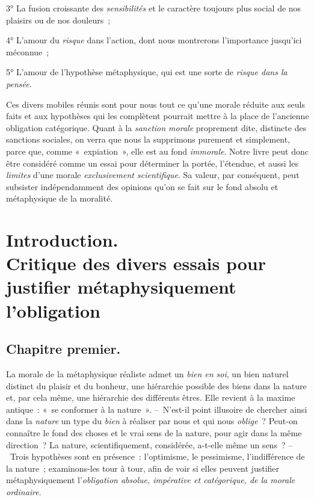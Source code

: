 \documentclass[french,twoside]{book} %
\begin{document}
3° La fusion croissante des \emph{sensibilités} et le caractère toujours plus social de nos plaisirs ou de nos douleurs ;\par
4° L’amour du \emph{risque} dans l’action, dont nous montrerons l’importance jusqu’ici méconnue ;\par
5° L’amour de l’hypothèse métaphysique, qui est une sorte de \emph{risque dans la pensée}.\par
Ces divers mobiles réunis sont pour nous tout ce qu’une morale réduite aux seuls faits et aux hypothèses qui les complètent pourrait mettre à la place de l’ancienne obligation catégorique. Quant à la \emph{sanction morale} proprement dite, distincte des sanctions sociales, on verra que nous la supprimons purement et simplement, parce que, comme « expiation », elle est au fond \emph{immorale}. Notre livre peut donc être considéré comme un essai pour déterminer la portée, l’étendue, et aussi les \emph{limites} d’une morale \emph{exclusivement scientifique}. Sa valeur, par conséquent, peut subsister indépendamment des opinions qu’on se fait sur le fond absolu et métaphysique de la moralité.
\section[{Introduction. Critique des divers essais pour justifier métaphysiquement l’obligation}]{Introduction. \\
Critique des divers essais pour justifier métaphysiquement l’obligation}\renewcommand{\leftmark}{Introduction. \\
Critique des divers essais pour justifier métaphysiquement l’obligation}

\subsection[{Chapitre premier.}]{Chapitre premier.}
\noindent La morale de la métaphysique réaliste admet un \emph{bien en soi}, un bien naturel distinct du plaisir et du bonheur, une hiérarchie possible des biens dans la nature et, par cela même, une hiérarchie des différents êtres. Elle revient à la maxime antique : « se conformer à la nature ». – N’est-il point illusoire de chercher ainsi dans la \emph{nature} un type du \emph{bien} à réaliser par nous et qui nous \emph{oblige} ? Peut-on connaître le fond des choses et le vrai sens de la nature, pour agir dans la même direction ? La nature, scientifiquement, considérée, a-t-elle même un sens ? – Trois hypothèses sont en présence : l’optimisme, le pessimisme, l’indifférence de la nature ; examinons-les tour à tour, afin de voir si elles peuvent justifier métaphysiquement l’\emph{obligation absolue, impérative et catégorique, de la morale ordinaire}.\par
\end{document}
